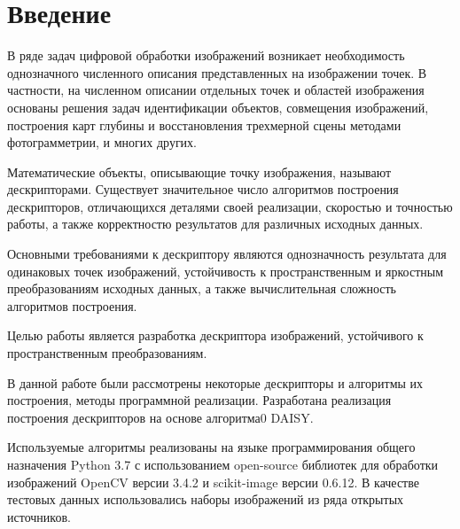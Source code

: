 \section*{Введение}
{	
	В ряде задач цифровой обработки изображений возникает необходимость однозначного численного описания представленных на изображении точек. В частности, на численном описании отдельных точек и областей изображения основаны решения задач идентификации объектов, совмещения изображений, построения карт глубины и восстановления трехмерной сцены методами фотограмметрии, и многих других.
	
	Математические объекты, описывающие точку изображения, называют дескрипторами. Существует значительное число алгоритмов построения дескрипторов, отличающихся деталями своей реализации, скоростью и точностью работы, а также корректностю результатов для различных исходных данных. 
	
	Основными требованиями к дескриптору являются однозначность результата для одинаковых точек изображений, устойчивость к пространственным и яркостным преобразованиям исходных данных, а также вычислительная сложность алгоритмов построения. 
	
	Целью работы является разработка дескриптора изображений, устойчивого к пространственным преобразованиям.
	
	В данной работе были рассмотрены некоторые дескрипторы и алгоритмы их построения, методы программной реализации. Разработана реализация построения дескрипторов на основе алгоритма0 DAISY.  
	
	Используемые алгоритмы реализованы на языке программирования общего назначения Python 3.7 с использованием open-source библиотек для обработки изображений OpenCV версии 3.4.2 и scikit-image версии 0.6.12. В качестве тестовых данных использовались наборы изображений из ряда открытых источников.
}

\newpage

